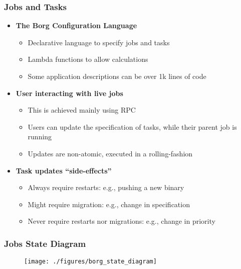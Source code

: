 \begin{frame}
\frametitle{Jobs and Tasks}

\begin{itemize}
	\item {\bf The Borg Configuration Language}
	\begin{itemize}
		\item Declarative language to specify jobs and tasks
		\item Lambda functions to allow calculations
		\item Some application descriptions can be over 1k lines of code
	\end{itemize}

\vspace{20pt}

	\item {\bf User interacting with live jobs}
	\begin{itemize}
		\item This is achieved mainly using RPC
		\item Users can update the specification of tasks, while their parent job is running
		\item Updates are non-atomic, executed in a rolling-fashion
	\end{itemize}

\vspace{20pt}

	\item {\bf Task updates ``side-effects''}
	\begin{itemize}
		\item Always require restarts: e.g., pushing a new binary
		\item Might require migration: e.g., change in specification
		\item Never require restarts nor migrations: e.g., change in priority
	\end{itemize}
\end{itemize}
\end{frame}

\begin{frame}
\frametitle{Jobs State Diagram}
\begin{figure}[h]
  \centering
  \texttt{[image: ./figures/borg\_state\_diagram]}
  \label{fig:borg_state_diagram}
\end{figure}
\end{frame}

